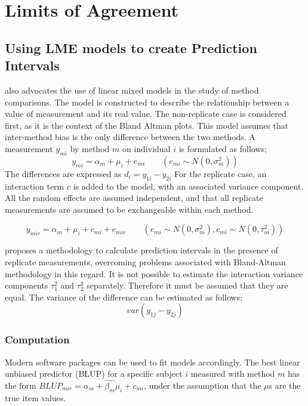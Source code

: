 \documentclass{report}
\begin{document}
	\chapter{Limits of Agreement}
	\section{Using LME models to create Prediction Intervals}
	\citet{BXC2004} also advocates the use of linear mixed models in
	the study of method comparisons. The model is constructed to
	describe the relationship between a value of measurement and its
	real value. The non-replicate case is considered first, as it is
	the context of the Bland Altman plots. This model assumes that
	inter-method bias is the only difference between the two methods.
	A measurement $y_{mi}$ by method $m$ on individual $i$ is
	formulated as follows;
	\begin{equation}
	y_{mi}  = \alpha_{m} + \mu_{i} + e_{mi} \qquad ( e_{mi} \sim
	N(0,\sigma^{2}_{m}))
	\end{equation}
	The differences are expressed as $d_{i} = y_{1i} - y_{2i}$ For the
	replicate case, an interaction term $c$ is added to the model,
	with an associated variance component. All the random effects are
	assumed independent, and that all replicate measurements are
	assumed to be exchangeable within each method.
	
	\begin{equation}
	y_{mir}  = \alpha_{m} + \mu_{i} + c_{mi} + e_{mir} \qquad ( e_{mi}
	\sim N(0,\sigma^{2}_{m}), c_{mi} \sim N(0,\tau^{2}_{m}))
	\end{equation}
	
	\citet{BXC2008} proposes a methodology to calculate prediction
	intervals in the presence of replicate measurements, overcoming
	problems associated with Bland-Altman methodology in this regard.
	It is not possible to estimate the interaction variance components
	$\tau^{2}_{1}$ and $\tau^{2}_{2}$ separately. Therefore it must be
	assumed that they are equal. The variance of the difference can be
	estimated as follows:
	\begin{equation}
	var(y_{1j}-y_{2j})
	\end{equation}
	
	\subsection{Computation} Modern software
	packages can be used to fit models accordingly. The best linear
	unbiased predictor (BLUP) for a specific subject $i$ measured with
	method $m$ has the form $BLUP_{mir} = \hat{\alpha_{m}} +
	\hat{\beta_{m}}\mu_{i} + c_{mi}$, under the assumption that the
	$\mu$s are the true item values.
	
\end{document}
